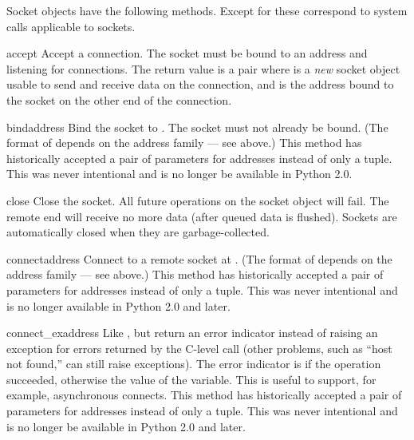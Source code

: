 Socket objects have the following methods.  Except for
 these correspond to \UNIX{} system calls
applicable to sockets.

\begin{methoddesc}[socket]{accept}{}
Accept a connection.
The socket must be bound to an address and listening for connections.
The return value is a pair 
where  is a \emph{new} socket object usable to send and
receive data on the connection, and  is the address bound
to the socket on the other end of the connection.
\end{methoddesc}

\begin{methoddesc}[socket]{bind}{address}
Bind the socket to .  The socket must not already be bound.
(The format of  depends on the address family --- see
above.)    This method has historically accepted a pair
of parameters for  addresses instead of only a
tuple.  This was never intentional and is no longer be available in
Python 2.0.
\end{methoddesc}

\begin{methoddesc}[socket]{close}{}
Close the socket.  All future operations on the socket object will fail.
The remote end will receive no more data (after queued data is flushed).
Sockets are automatically closed when they are garbage-collected.
\end{methoddesc}

\begin{methoddesc}[socket]{connect}{address}
Connect to a remote socket at .
(The format of  depends on the address family --- see
above.)    This method has historically accepted a pair
of parameters for  addresses instead of only a
tuple.  This was never intentional and is no longer available in
Python 2.0 and later.
\end{methoddesc}

\begin{methoddesc}[socket]{connect_ex}{address}
Like , but return an error indicator
instead of raising an exception for errors returned by the C-level
 call (other problems, such as ``host not found,''
can still raise exceptions).  The error indicator is  if the
operation succeeded, otherwise the value of the 
variable.  This is useful to support, for example, asynchronous connects.
  This method has historically accepted a pair of
parameters for  addresses instead of only a tuple.
This was never intentional and is no longer be available in Python
2.0 and later.
\end{methoddesc}

